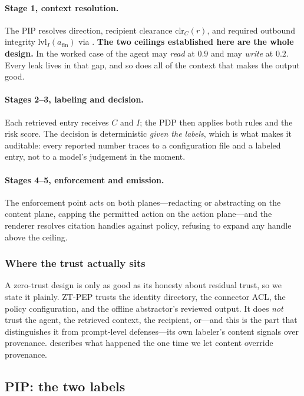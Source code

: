 \documentclass[conference,compsoc]{IEEEtran}
\newcommand{\Cl}{\ensuremath{C}}                 %
\newcommand{\Il}{\ensuremath{I}}                 %
\newcommand{\clr}{\ensuremath{\mathrm{clr}_C}}   %
\newcommand{\lvlI}{\ensuremath{\mathrm{lvl}_I}}  %
\newcommand{\afin}{\ensuremath{a_{\mathrm{fin}}}}
\newcommand{\sys}{ZT-PEP}                        %
\begin{document}
\paragraph{Stage 1, context resolution.} The PIP resolves direction, recipient
clearance $\clr(r)$, and required outbound integrity $\lvlI(\afin)$ via
. \textbf{The two ceilings established here are the whole
design.} In the worked case of  the agent may \emph{read} at
$0.9$ and may \emph{write} at $0.2$. Every leak lives in that gap, and so does
all of the context that makes the output good.

\paragraph{Stages 2--3, labeling and decision.} Each retrieved entry receives
$\Cl$ and $\Il$; the PDP then applies both rules and the risk score. The
decision is deterministic \emph{given the labels}, which is what makes it
auditable: every reported number traces to a configuration file and a labeled
entry, not to a model's judgement in the moment.

\paragraph{Stages 4--5, enforcement and emission.} The enforcement point acts
on both planes---redacting or abstracting on the content plane, capping the
permitted action on the action plane---and the renderer resolves citation
handles against policy, refusing to expand any handle above the ceiling.

\subsubsection{Where the trust actually sits}

A zero-trust design is only as good as its honesty about residual trust, so we
state it plainly. \sys{} trusts the identity directory, the connector ACL, the
policy configuration, and the offline abstractor's reviewed output. It does
\emph{not} trust the agent, the retrieved context, the recipient, or---and this
is the part that distinguishes it from prompt-level defenses---its own
labeler's content signals over provenance.  describes
what happened the one time we let content override provenance.

\subsection{PIP: the two labels}
\label{sec:method:labels}
\end{document}
